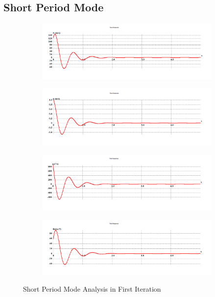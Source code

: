\subsection{Short Period Mode}
\begin{figure}[H]
\begin{subfigure}{0.48\textwidth}
\includegraphics[width = \linewidth]{w__1_.png}
\end{subfigure}
\begin{subfigure}{0.48\textwidth}
\includegraphics[width = \linewidth]{u__1_.png}
\end{subfigure}
\medskip
\begin{subfigure}{0.48\textwidth}
\includegraphics[width = \linewidth]{q__1_.png}
\end{subfigure}
\begin{subfigure}{0.48\textwidth}
\includegraphics[width = \linewidth]{theta__1_.png}
\end{subfigure}
\caption{Short Period Mode Analysis in First Iteration}
\end{figure}
